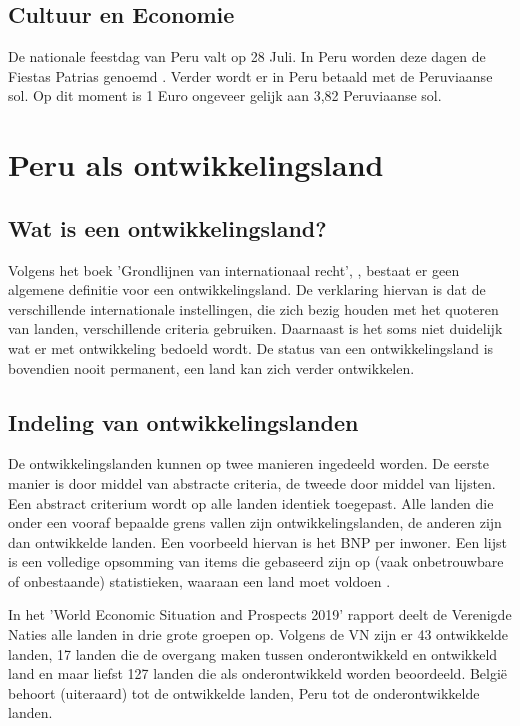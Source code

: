 \subsection{Cultuur en Economie}
De nationale feestdag van Peru valt op 28 Juli. In Peru worden deze dagen de Fiestas Patrias genoemd \autocite{dosmanosperu2018}. Verder wordt er in Peru betaald met de Peruviaanse sol. Op dit moment is 1 Euro ongeveer gelijk aan 3,82 Peruviaanse sol.

\section{Peru als ontwikkelingsland}
\subsection{Wat is een ontwikkelingsland?}
Volgens het boek 'Grondlijnen van internationaal recht', \autocite{MarcJ.Bossuyt2005}, bestaat er geen algemene definitie voor een ontwikkelingsland. De verklaring hiervan is dat de verschillende internationale instellingen, die zich bezig houden met het quoteren van landen, verschillende criteria gebruiken. Daarnaast is het soms niet duidelijk wat er met ontwikkeling bedoeld wordt. De status van een ontwikkelingsland is bovendien nooit permanent, een land kan zich verder ontwikkelen.

\subsection{Indeling van ontwikkelingslanden}
De ontwikkelingslanden kunnen op twee manieren ingedeeld worden. De eerste manier is door middel van abstracte criteria, de tweede door middel van lijsten. Een abstract criterium wordt op alle landen identiek toegepast. Alle landen die onder een vooraf bepaalde grens vallen zijn ontwikkelingslanden, de anderen zijn dan ontwikkelde landen. Een voorbeeld hiervan is het BNP per inwoner. Een lijst is een volledige opsomming van items die gebaseerd zijn op (vaak onbetrouwbare of onbestaande) statistieken, waaraan een land moet voldoen \autocite{MarcJ.Bossuyt2005}.

In het 'World Economic Situation and Prospects 2019' rapport \autocite{unitednations2019} deelt de Verenigde Naties alle landen in drie grote groepen op. Volgens de VN zijn er 43 ontwikkelde landen, 17 landen die de overgang maken tussen onderontwikkeld en ontwikkeld land en maar liefst 127 landen die als onderontwikkeld worden beoordeeld. België behoort (uiteraard) tot de ontwikkelde landen, Peru tot de onderontwikkelde landen.

